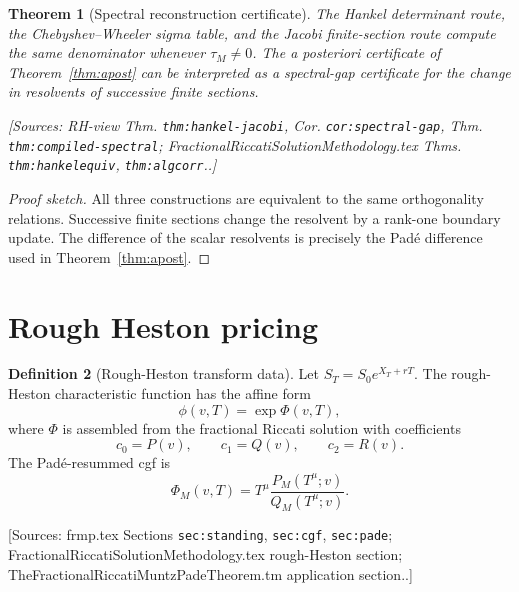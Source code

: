 \documentclass[11pt]{article}
\newtheorem{theorem}{Theorem}[section]
\theoremstyle{definition}
\newtheorem{definition}[theorem]{Definition}
\newcommand{\Source}[1]{\par\smallskip\noindent\textup{[Sources: #1.]}}
\begin{document}
\begin{theorem}[Spectral reconstruction certificate]\label{thm:spectral-certificate}
The Hankel determinant route,
the Chebyshev--Wheeler sigma table,
and the Jacobi finite-section route compute the same denominator whenever $\tau_M\ne0$.
The a posteriori certificate of Theorem~\ref{thm:apost} can be interpreted as a spectral-gap certificate for the change in resolvents of successive finite sections.
\Source{RH-view Thm. \texttt{thm:hankel-jacobi}, Cor. \texttt{cor:spectral-gap}, Thm. \texttt{thm:compiled-spectral}; FractionalRiccatiSolutionMethodology.tex Thms. \texttt{thm:hankelequiv}, \texttt{thm:algcorr}.}
\end{theorem}

\begin{proof}[Proof sketch]
All three constructions are equivalent to the same orthogonality relations.
Successive finite sections change the resolvent by a rank-one boundary update.
The difference of the scalar resolvents is precisely the Padé difference used in Theorem~\ref{thm:apost}.
\end{proof}

\section{Rough Heston pricing}

\begin{definition}[Rough-Heston transform data]\label{def:heston-data}
Let $S_T=S_0e^{X_T+rT}$.
The rough-Heston characteristic function has the affine form
\begin{equation}\label{eq:char-affine}
        \phi(v,T)=\exp\Phi(v,T),
\end{equation}
where $\Phi$ is assembled from the fractional Riccati solution with coefficients
\begin{equation}\label{eq:heston-symbols}
        c_0=P(v),
        \qquad
        c_1=Q(v),
        \qquad
        c_2=R(v).
\end{equation}
The Padé-resummed cgf is
\begin{equation}\label{eq:heston-pade}
        \Phi_M(v,T)=T^{\mu}\frac{P_M(T^{\mu};v)}{Q_M(T^{\mu};v)}.
\end{equation}
\Source{frmp.tex Sections \texttt{sec:standing}, \texttt{sec:cgf}, \texttt{sec:pade}; FractionalRiccatiSolutionMethodology.tex rough-Heston section; TheFractionalRiccatiMuntzPadeTheorem.tm application section.}
\end{definition}
\end{document}
